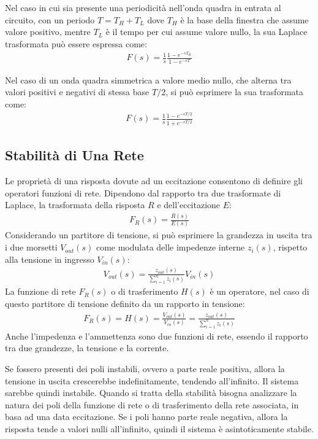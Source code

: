 \documentclass{article}
\numberwithin{equation}{subsection}
\begin{document}
Nel caso in cui sia presente una periodicità nell'onda quadra in entrata al circuito, con un periodo $T=T_H+T_L$ dove $T_H$ è la base della finestra che assume valore positivo, 
mentre $T_L$ è il tempo per cui assume valore nullo, la sua Laplace trasformata può essere espressa come:
\begin{gather*}
    F(s)=\displaystyle\frac{1}{s}\frac{1-e^{-sT_H}}{1-e^{-sT}}
\end{gather*}

Nel caso di un onda quadra simmetrica a valore medio nullo, che alterna tra valori positivi e negativi di stessa base $T/2$, si può esprimere la sua trasformata come:
\begin{gather*}
    F(s)=\displaystyle\frac{1}{s}\frac{1-e^{-sT/2}}{1+e^{-sT/2}}
\end{gather*}

\subsection{Stabilità di Una Rete}

Le proprietà di una risposta dovute ad un eccitazione consentono di definire gli operatori funzioni di rete. Dipendono dal rapporto tra due 
trasformate di Laplace, la trasformata della risposta $R$ e dell'eccitazione $E$:
\begin{gather*}
    F_R(s)=\displaystyle\frac{R(s)}{E(s)}
\end{gather*}
Considerando un partitore di tensione, si può esprimere la grandezza in uscita tra i due morsetti $V_{out}(s)$ come modulata delle impedenze interne $z_i(s)$, 
rispetto alla tensione in ingresso $V_{in}(s)$:
\begin{gather*}
    \displaystyle V_{out}(s)=\frac{z_{out}(s)}{\sum_{i=1}^nz_i(s)}V_{in}(s)
\end{gather*}
La funzione di rete $F_R(s)$ o di trasferimento $H(s)$ è un operatore, nel caso di questo partitore di tensione definito da un rapporto in tensione:
\begin{gather*}
    F_R(s)=H(s)=\displaystyle\frac{V_{out}(s)}{V_{in}(s)}=\frac{z_{out}(s)}{\sum_{i=1}^nz_i(s)}
\end{gather*}
Anche l'impedenza e l'ammettenza sono due funzioni di rete, essendo il rapporto tra due grandezze, la tensione e la corrente. 

Se fossero presenti dei poli instabili, ovvero a parte reale positiva, allora la tensione in uscita crescerebbe indefinitamente, tendendo all'infinito. Il sistema sarebbe 
quindi instabile. 
Quando si tratta della stabilità bisogna analizzare la natura dei poli della funzione di rete o di trasferimento della rete associata, in basa ad una data eccitazione. 
Se i poli hanno parte reale negativa, allora la risposta tende a valori nulli all'infinito, quindi il sistema è asintoticamente stabile. 
\end{document}
